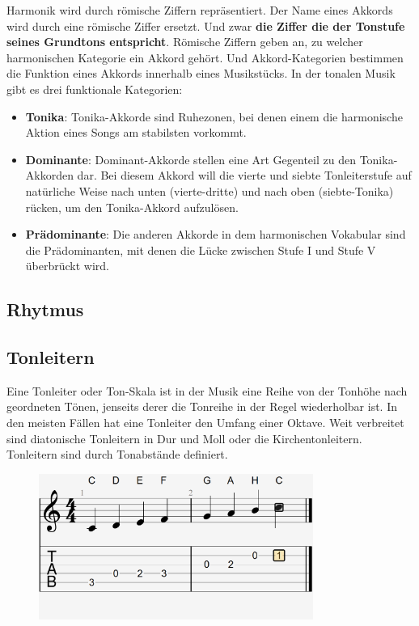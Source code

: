 Harmonik wird durch römische Ziffern repräsentiert. Der Name eines Akkords wird durch eine römische Ziffer
ersetzt. Und zwar \textbf{die Ziffer die der Tonstufe seines Grundtons entspricht}. Römische Ziffern geben an, 
zu welcher harmonischen Kategorie ein Akkord gehört. Und Akkord-Kategorien bestimmen die Funktion eines 
Akkords innerhalb eines Musikstücks. In der tonalen Musik gibt es drei funktionale Kategorien:

\begin{itemize}
    \item \textbf{Tonika}: Tonika-Akkorde sind Ruhezonen, bei denen einem die harmonische Aktion eines 
    Songs am stabilsten vorkommt.
    \item \textbf{Dominante}: Dominant-Akkorde stellen eine Art Gegenteil zu den Tonika-Akkorden dar. 
    Bei diesem Akkord will die vierte und siebte Tonleiterstufe auf natürliche Weise nach unten 
    (vierte-dritte) und nach oben (siebte-Tonika) rücken, um den Tonika-Akkord aufzulösen.
    \item \textbf{Prädominante}: Die anderen Akkorde in dem harmonischen Vokabular sind die Prädominanten, 
    mit denen die Lücke zwischen Stufe I und Stufe V überbrückt wird.

\end{itemize}


\subsection{Rhytmus}

\subsection{Tonleitern}
Eine Tonleiter oder Ton-Skala ist in der Musik eine Reihe von der Tonhöhe nach geordneten Tönen, 
jenseits derer die Tonreihe in der Regel wiederholbar ist. In den meisten Fällen hat eine Tonleiter 
den Umfang einer Oktave. Weit verbreitet sind diatonische Tonleitern in Dur und Moll oder die 
Kirchentonleitern. Tonleitern sind durch Tonabstände definiert.

\begin{figure}[htbp]
    \centering
    \includegraphics[width=0.8\textwidth]{images/C_Dur_Tonika}
\end{figure}

